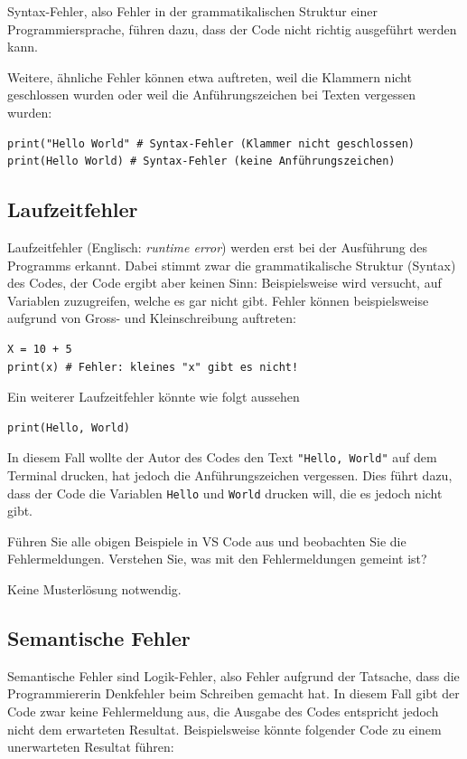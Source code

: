 Syntax-Fehler, also Fehler in der grammatikalischen Struktur einer Programmiersprache, führen dazu, dass der Code nicht richtig ausgeführt werden kann.

Weitere, ähnliche Fehler können etwa auftreten, weil die Klammern nicht geschlossen wurden oder weil die Anführungszeichen bei Texten vergessen wurden:

\begin{lstlisting}
print("Hello World" # Syntax-Fehler (Klammer nicht geschlossen)
print(Hello World) # Syntax-Fehler (keine Anführungszeichen)
\end{lstlisting}

\subsection{Laufzeitfehler}
Laufzeitfehler (Englisch: \emph{runtime error}) werden erst bei der Ausführung des Programms erkannt. Dabei stimmt zwar die grammatikalische Struktur (Syntax) des Codes, der Code ergibt aber keinen Sinn: Beispielsweise wird versucht, auf Variablen zuzugreifen, welche es gar nicht gibt. Fehler können beispielsweise aufgrund von Gross- und Kleinschreibung auftreten:

\begin{lstlisting}
X = 10 + 5
print(x) # Fehler: kleines "x" gibt es nicht!
\end{lstlisting}

Ein weiterer Laufzeitfehler könnte wie folgt aussehen

\begin{lstlisting}
print(Hello, World)
\end{lstlisting}

In diesem Fall wollte der Autor des Codes den Text \lstinline|"Hello, World"| auf dem Terminal drucken, hat jedoch die Anführungszeichen vergessen. Dies führt dazu, dass der Code die Variablen \texttt{Hello} und \texttt{World} drucken will, die es jedoch nicht gibt.

\begin{myexercise}
	Führen Sie alle obigen Beispiele in VS Code aus und beobachten Sie die Fehlermeldungen. Verstehen Sie, was mit den Fehlermeldungen gemeint ist?
	\begin{myanswer}
		Keine Musterlösung notwendig.
	\end{myanswer}
\end{myexercise}


\subsection{Semantische Fehler}
\label{subsec:semantische-fehler}
Semantische Fehler sind Logik-Fehler, also Fehler aufgrund der Tatsache, dass die Programmiererin Denkfehler beim Schreiben gemacht hat. In diesem Fall gibt der Code zwar keine Fehlermeldung aus, die Ausgabe des Codes entspricht jedoch nicht dem erwarteten Resultat. Beispielsweise könnte folgender Code zu einem unerwarteten Resultat führen:

